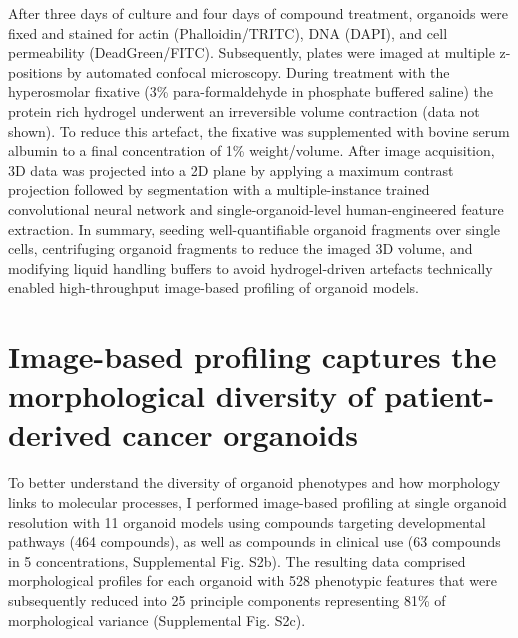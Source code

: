 \begin{flushleft}
After three days of culture and four days of compound treatment, organoids were fixed and stained for actin (Phalloidin/TRITC), DNA (DAPI), and cell permeability (DeadGreen/FITC). Subsequently, plates were imaged at multiple z-positions by automated confocal microscopy. During treatment with the hyperosmolar fixative (3\% para-formaldehyde in phosphate buffered saline) the protein rich hydrogel underwent an irreversible volume contraction (data not shown). To reduce this artefact, the fixative was supplemented with bovine serum albumin to a final concentration of 1\% weight/volume. After image acquisition, 3D data was projected into a 2D plane by applying a maximum contrast projection followed by segmentation with a multiple-instance trained convolutional neural network and single-organoid-level human-engineered feature extraction. In summary, seeding well-quantifiable organoid fragments over single cells, centrifuging organoid fragments to reduce the imaged 3D volume, and modifying liquid handling buffers to avoid hydrogel-driven artefacts technically enabled high-throughput image-based profiling of organoid models. 

\section{Image-based profiling captures the morphological diversity of patient-derived cancer organoids}

To better understand the diversity of organoid phenotypes and how morphology links to molecular processes, I performed image-based profiling at single organoid resolution with 11 organoid models using compounds targeting developmental pathways (464 compounds), as well as compounds in clinical use (63 compounds in 5 concentrations, Supplemental Fig. S2b). The resulting data comprised morphological profiles for each organoid with 528 phenotypic features that were subsequently reduced into 25 principle components representing 81\% of morphological variance (Supplemental Fig. S2c).

\bigbreak


\end{flushleft}
